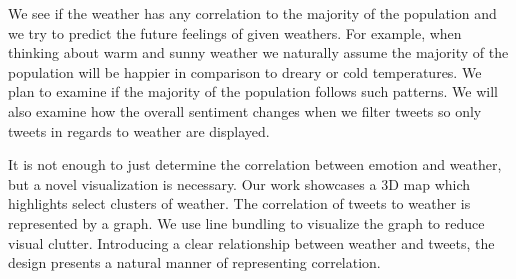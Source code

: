 We see if the weather has any correlation to the majority of the population and we try to predict the future feelings of given weathers. For example, when thinking about warm and sunny weather we naturally assume the majority of the population will be happier in comparison to dreary or cold temperatures. We plan to examine if the majority of the population follows such patterns. We will also examine how the overall sentiment changes when we filter tweets so only tweets in regards to weather are displayed.

It is not enough to just determine the correlation between emotion and weather, but a novel visualization is necessary. Our work showcases a 3D map which highlights select clusters of weather. The correlation of tweets to weather is represented by a graph. We use line bundling to visualize the graph to reduce visual clutter. Introducing a clear relationship between weather and tweets, the design presents a natural manner of representing correlation. 